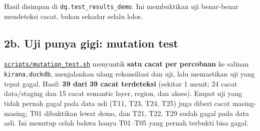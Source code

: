 \documentclass[10pt,a4paper]{article}
\begin{document}
Hasil disimpan di \texttt{dq.test\_\allowbreak{}results\_\allowbreak{}demo}. Ini membuktikan uji benar-benar mendeteksi cacat, bukan sekadar selalu lolos.

\subsection{2b. Uji punya gigi: mutation test}\label{b.-uji-punya-gigi-mutation-test}

\href{https://github.com/titan2903/kirana-omnichannel-performance-intelligence/blob/master/scripts/mutation_test.sh}{\texttt{scripts/mutation\_\allowbreak{}test.sh}} menyuntik \textbf{satu cacat per percobaan} ke salinan \texttt{kirana.duckdb}, menjalankan ulang rekonsiliasi dan uji,
lalu memastikan uji yang tepat gagal. Hasil: \textbf{39 dari 39 cacat terdeteksi} (sekitar 1 menit; 24 cacat data/staging dan 15 cacat semantic layer, region, dan akses). Empat uji yang tidak pernah gagal pada data asli (T11, T23, T24, T25) juga diberi cacat masing-masing; T01 dibuktikan lewat demo, dan T21, T22, T29 sudah gagal pada data asli. Ini menutup celah bahwa hanya
T01--T05 yang pernah terbukti bisa gagal.
\end{document}
